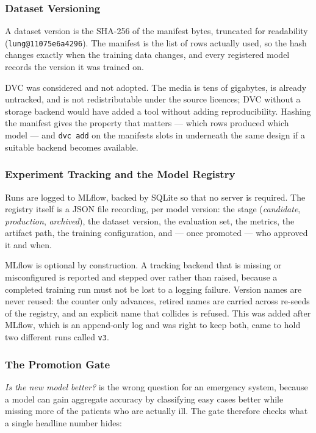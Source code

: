 \subsubsection{Dataset Versioning}

A dataset version is the SHA-256 of the manifest bytes, truncated for readability
(\texttt{lung@11075e6a4296}). The manifest is the list of rows actually used, so the hash
changes exactly when the training data changes, and every registered model records the version
it was trained on.

DVC was considered and not adopted. The media is tens of gigabytes, is already untracked, and
is not redistributable under the source licences; DVC without a storage backend would have
added a tool without adding reproducibility. Hashing the manifest gives the property that
matters --- which rows produced which model --- and \texttt{dvc add} on the manifests slots in
underneath the same design if a suitable backend becomes available.

\subsubsection{Experiment Tracking and the Model Registry}

Runs are logged to MLflow, backed by SQLite so that no server is required. The registry itself
is a JSON file recording, per model version: the stage (\emph{candidate}, \emph{production},
\emph{archived}), the dataset version, the evaluation set, the metrics, the artifact path, the
training configuration, and --- once promoted --- who approved it and when.

MLflow is optional by construction. A tracking backend that is missing or misconfigured is
reported and stepped over rather than raised, because a completed training run must not be
lost to a logging failure. Version names are never reused: the counter only advances, retired
names are carried across re-seeds of the registry, and an explicit name that collides is
refused. This was added after MLflow, which is an append-only log and was right to keep both,
came to hold two different runs called \texttt{v3}.

\subsubsection{The Promotion Gate}

\emph{Is the new model better?} is the wrong question for an emergency system, because a model
can gain aggregate accuracy by classifying easy cases better while missing more of the patients
who are actually ill. The gate therefore checks what a single headline number hides:

